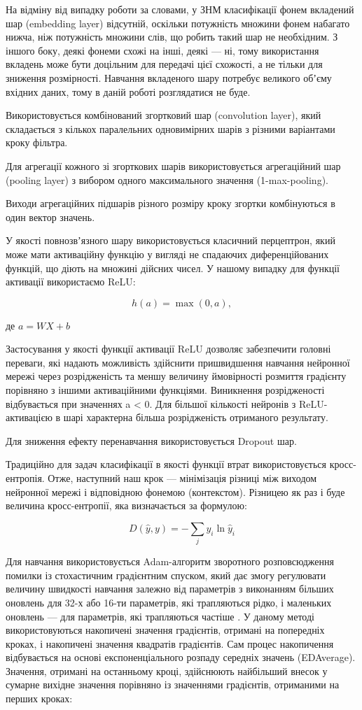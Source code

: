 На відміну від випадку роботи за словами, у ЗНМ класифікації фонем вкладений шар (embedding layer) відсутній, оскільки потужність множини фонем набагато нижча, ніж потужність множини слів, що робить такий шар не необхідним. З іншого боку, деякі фонеми схожі на інші, деякі --- ні, тому використання вкладень може бути доцільним для передачі цієї схожості, а не тільки для зниження розмірності. Навчання вкладеного шару потребує великого обʼєму вхідних даних, тому в даній роботі розглядатися не буде.

Використовується комбінований згортковий шар (convolution layer), який складається з кількох паралельних одновимірних шарів з різними варіантами кроку фільтра.

Для агрегації кожного зі згорткових шарів використовується агрегаційний шар (pooling layer) з вибором одного максимального значення (1-max-pooling).

Виходи агрегаційних підшарів різного розміру кроку згортки комбінуються в один вектор значень.

У якості повнозвʼязного шару використовується класичний перцептрон, який може мати активаційну функцію у вигляді не спадаючих диференційованих функцій, що діють на множині дійсних чисел. У нашому випадку для функції активації використаємо ReLU:

\[
h(a) = \max(0, a),
\]

\noindent
де $a=WX+b$

Застосування у якості функції активації ReLU дозволяє забезпечити головні переваги, які надають можливість здійснити пришвидшення навчання нейронної мережі через розрідженість та меншу величину ймовірності розмиття градієнту порівняно з іншими активаційними функціями. Виникнення розрідженості відбувається при значеннях a < 0. Для більшої кількості нейронів з ReLU-активацією в шарі характерна більша розрідженість отриманого результату.

Для зниження ефекту перенавчання використовується Dropout шар.

Традиційно для задач класифікації в якості функції втрат використовується кросс-ентропія. Отже, наступний наш крок --- мінімізація різниці між виходом нейронної мережі і відповідною фонемою (контекстом). Різницею як раз і буде величина кросс-ентропії, яка визначається за формулою:

\[
D(\hat{y},y)=-\sum_j y_i \ln \hat{y}_i
\]

Для навчання використовується Adam-алгоритм зворотного розповсюдження помилки із стохастичним градієнтним спуском, який дає змогу регулювати величину швидкості навчання залежно від параметрів з виконанням більших оновлень для 32-х або 16-ти параметрів, які трапляються рідко, і маленьких оновлень --- для параметрів, які трапляються частіше \cite{Kingma_2014}. У даному методі використовуються накопичені значення градієнтів, отримані на попередніх кроках, і накопичені значення квадратів градієнтів. Сам процес накопичення відбувається на основі експоненціального розпаду середніх значень (EDAverage). Значення, отримані на останньому кроці, здійснюють найбільший внесок у сумарне вихідне значення порівняно із значеннями градієнтів, отриманими на перших кроках:

